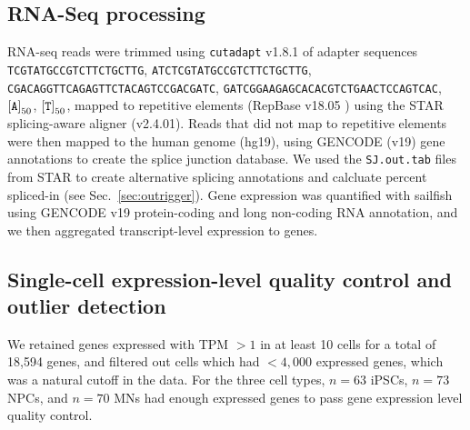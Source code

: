 \subsection{RNA-Seq processing}

RNA-seq reads were trimmed using \texttt{cutadapt} v1.8.1 of adapter sequences \texttt{TCGTATGCCGTCTTCTGCTTG}, \texttt{ATCTCGTATGCCGTCTTCTGCTTG}, \\\texttt{CGACAGGTTCAGAGTTCTACAGTCCGACGATC}, \texttt{GATCGGAAGAGCACACGTCTGAACTCCAGTCAC}, $\left[\text{\texttt{A}}\right]_{50}$, $\left[\text{\texttt{T}}\right]_{50}$, mapped to repetitive elements (RepBase v18.05 \cite{Jurka:2005tp}) using the STAR\cite{Dobin:2013fg} splicing-aware aligner (v2.4.01). Reads that did not map to repetitive elements were then mapped to the human genome (hg19), using GENCODE\cite{Harrow:2012cx} (v19) gene annotations to create the splice junction database. We used the  \texttt{SJ.out.tab} files from STAR to create alternative splicing annotations and calcluate percent spliced-in (see Sec.~\ref{sec:outrigger}). Gene expression was quantified with sailfish\cite{Patro:2014jd} using GENCODE v19 protein-coding and long non-coding RNA annotation, and we then aggregated transcript-level expression to genes.



\subsection{Single-cell expression-level quality control and outlier detection}

We retained genes expressed with TPM $> 1$ in at least 10 cells for a total of 18,594 genes, and filtered out cells which had $<4,000$ expressed genes, which was a natural cutoff in the data. For the three cell types, $n=63$ iPSCs, $n=73$ NPCs, and $n=70$ MNs had enough expressed genes to pass gene expression level quality control.


